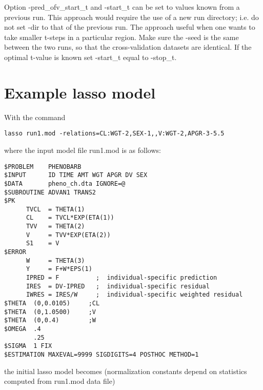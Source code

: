 \documentclass[a4paper,12pt]{article}
\begin{document}
Option -pred\_ofv\_start\_t and -start\_t can be set to values known from a previous run. This approach would require the use of a new run directory; i.e. do not set -dir to that of the previous run. The approach useful when one wants to take smaller t-steps in a particular region. Make sure the -seed is the same between the two runs, so that the cross-validation datasets are identical. If the optimal t-value is known set -start\_t equal to -stop\_t. 

\section{Example lasso model}

With the command
\begin{verbatim}
lasso run1.mod -relations=CL:WGT-2,SEX-1,,V:WGT-2,APGR-3-5.5
\end{verbatim}

where the input model file run1.mod is as follows:

\begin{verbatim}
$PROBLEM    PHENOBARB 
$INPUT      ID TIME AMT WGT APGR DV SEX
$DATA       pheno_ch.dta IGNORE=@
$SUBROUTINE ADVAN1 TRANS2
$PK
      TVCL  = THETA(1)
      CL    = TVCL*EXP(ETA(1))
      TVV   = THETA(2)
      V     = TVV*EXP(ETA(2))
      S1    = V
$ERROR      
      W     = THETA(3)
      Y     = F+W*EPS(1)
      IPRED = F          ;  individual-specific prediction
      IRES  = DV-IPRED   ;  individual-specific residual
      IWRES = IRES/W     ;  individual-specific weighted residual
$THETA  (0,0.0105)     ;CL
$THETA  (0,1.0500)     ;V
$THETA  (0,0.4)        ;W
$OMEGA  .4
        .25
$SIGMA  1 FIX
$ESTIMATION MAXEVAL=9999 SIGDIGITS=4 POSTHOC METHOD=1
\end{verbatim}

the initial lasso model becomes (normalization constants depend on statistics computed from run1.mod data file)
\end{document}
